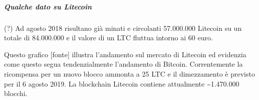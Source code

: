 \subparagraph{Qualche dato su Litecoin} (?)
Ad agosto 2018 risultano già minati e circolanti 57.000.000 Litecoin su un totale di 84.000.000 e il valore di un LTC fluttua intorno ai 60 euro.

Questo grafico [fonte] illustra l’andamento sul mercato di Litecoin ed evidenzia come questo segua tendenzialmente l’andamento di Bitcoin.
Correntemente la ricompensa per un nuovo blocco ammonta a 25 LTC e il dimezzamento è previsto per il 6 agosto 2019.
La blockchain Litecoin contiene attualmente \~{}1.470.000 blocchi.